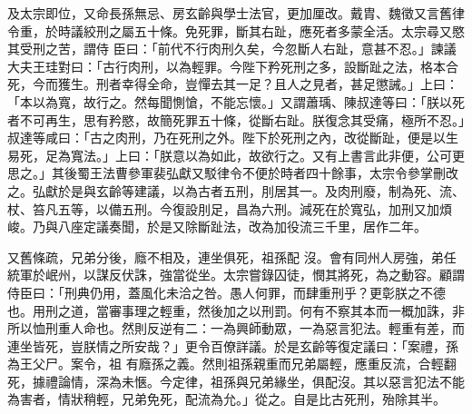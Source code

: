 \begin{pinyinscope}
 及太宗即位，又命長孫無忌、房玄齡與學士法官，更加厘改。戴胄、魏徵又言舊律令重，於時議絞刑之屬五十條。免死罪，斷其右趾，應死者多蒙全活。太宗尋又愍其受刑之苦，謂侍
 臣曰：「前代不行肉刑久矣，今忽斷人右趾，意甚不忍。」諫議大夫王珪對曰：「古行肉刑，以為輕罪。今陛下矜死刑之多，設斷趾之法，格本合死，今而獲生。刑者幸得全命，豈憚去其一足？且人之見者，甚足懲誡。」上曰：「本以為寬，故行之。然每聞惻愴，不能忘懷。」又謂蕭瑀、陳叔達等曰：「朕以死者不可再生，思有矜愍，故簡死罪五十條，從斷右趾。朕復念其受痛，極所不忍。」叔達等咸曰：「古之肉刑，乃在死刑之外。陛下於死刑之內，改從斷趾，便是以生
 易死，足為寬法。」上曰：「朕意以為如此，故欲行之。又有上書言此非便，公可更思之。」其後蜀王法曹參軍裴弘獻又駁律令不便於時者四十餘事，太宗令參掌刪改之。弘獻於是與玄齡等建議，以為古者五刑，刖居其一。及肉刑廢，制為死、流、杖、笞凡五等，以備五刑。今復設刖足，昌為六刑。減死在於寬弘，加刑又加煩峻。乃與八座定議奏聞，於是又除斷趾法，改為加役流三千里，居作二年。



 又舊條疏，兄弟分後，廕不相及，連坐俱死，祖孫配
 沒。會有同州人房強，弟任統軍於岷州，以謀反伏誅，強當從坐。太宗嘗錄囚徒，憫其將死，為之動容。顧謂侍臣曰：「刑典仍用，蓋風化未洽之咎。愚人何罪，而肆重刑乎？更彰朕之不德也。用刑之道，當審事理之輕重，然後加之以刑罰。何有不察其本而一概加誅，非所以恤刑重人命也。然則反逆有二：一為興師動眾，一為惡言犯法。輕重有差，而連坐皆死，豈朕情之所安哉？」更令百僚詳議。於是玄齡等復定議曰：「案禮，孫為王父尸。案令，祖
 有廕孫之義。然則祖孫親重而兄弟屬輕，應重反流，合輕翻死，據禮論情，深為未愜。今定律，祖孫與兄弟緣坐，俱配沒。其以惡言犯法不能為害者，情狀稍輕，兄弟免死，配流為允。」從之。自是比古死刑，殆除其半。




\end{pinyinscope}
